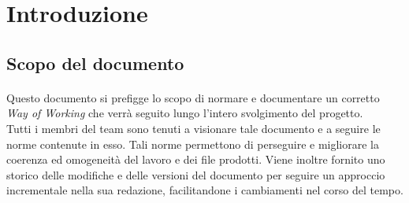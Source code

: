 \documentclass[10pt, a4paper]{article}
\title{\titolo}
\author{SWEetCode}
\begin{document}



\newpage

\tableofcontents
\newpage

\section{Introduzione}
\subsection{Scopo del documento}
\paragraph{}Questo documento si prefigge lo scopo di normare e documentare un corretto \textit{Way of Working} che verrà seguito lungo l'intero svolgimento del progetto.\\
	Tutti i membri del team sono tenuti a visionare tale documento e a seguire le norme contenute in esso. Tali norme permettono di perseguire e migliorare la coerenza ed omogeneità del lavoro e dei file prodotti.
	Viene inoltre fornito uno storico delle modifiche e delle versioni del documento per seguire un approccio incrementale nella sua redazione, facilitandone i cambiamenti nel corso del tempo.
\end{document}
